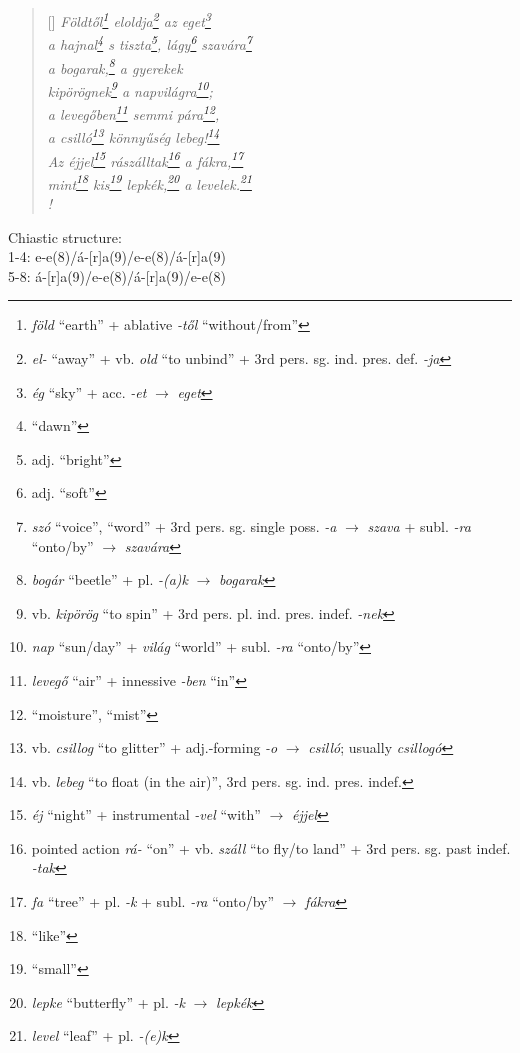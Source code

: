 \documentclass[a4paper,12pt,twoside,final]{book}
\begin{document}
\begin{verse}[\versewidth]
  \it
  Földtől\footnote{\emph{föld} ``earth'' +
  ablative \emph{-től} ``without/from''} eloldja\footnote{\emph{el-} ``away''
  + vb. \emph{old} ``to unbind'' + 3rd
  pers. sg. ind. pres. def. \emph{-ja}} az eget\footnote{\emph{ég}
  ``sky'' + acc. \emph{-et} $\rightarrow$ \emph{eget}} \\
  a hajnal\footnote{``dawn''} s tiszta\footnote{adj. ``bright''},
  lágy\footnote{adj. ``soft''} szavára\footnote{\emph{szó} ``voice'',
  ``word'' + 3rd pers. sg. single poss. \emph{-a} $\rightarrow$
  \emph{szava} + subl. \emph{-ra} ``onto/by'' $\rightarrow$
  \emph{szavára}} \\

  a bogarak,\footnote{\emph{bogár} ``beetle'' + pl. \emph{-(a)k}
  $\rightarrow$ \emph{bogarak}} a gyerekek \\
  kipörögnek\footnote{vb. \emph{kipörög} ``to spin'' + 3rd
  pers. pl. ind. pres. indef. \emph{-nek}}
  a napvilágra\footnote{\emph{nap} ``sun/day'' + \emph{világ}
  ``world'' + subl. \emph{-ra} ``onto/by''}; \\
  a levegőben\footnote{\emph{levegő} ``air'' +
  innessive \emph{-ben} ``in''} semmi pára\footnote{``moisture'', ``mist''}, \\
  a csilló\footnote{vb. \emph{csillog} ``to glitter'' +
  adj.-forming \emph{-o} $\rightarrow$
  \emph{csilló}; usually \emph{csillogó}} könnyűség
  lebeg!\footnote{vb. \emph{lebeg} ``to float (in the air)'', 3rd
  pers. sg. ind. pres. indef.} \\
  Az éjjel\footnote{\emph{éj} ``night'' + instrumental \emph{-vel}
  ``with'' $\rightarrow$ \emph{éjjel}} rászálltak\footnote{pointed
  action \emph{rá-} ``on'' + vb. \emph{száll} ``to fly/to
  land'' + 3rd pers. sg. past indef. \emph{-tak}} a
  fákra,\footnote{\emph{fa} ``tree'' +
  pl. \emph{-k} + subl. \emph{-ra} ``onto/by'' $\rightarrow$ \emph{fákra}} \\
  mint\footnote{``like''} kis\footnote{``small''} lepkék,\footnote{\emph{lepke}
  ``butterfly'' + pl. \emph{-k} $\rightarrow$ \emph{lepkék}} a
  levelek.\footnote{\emph{level} ``leaf'' + pl. \emph{-(e)k}} \\!
\end{verse}

\noindent Chiastic structure: \\
1-4: e-e(8)/á-[r]a(9)/e-e(8)/á-[r]a(9) \\
5-8: á-[r]a(9)/e-e(8)/á-[r]a(9)/e-e(8)

\newpage
\end{document}
